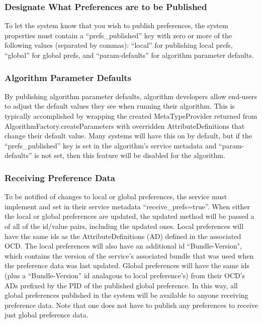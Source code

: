 \subsubsection*{Designate What Preferences are to be Published} To let the system
know that you wish to publish preferences, the system properties must contain a
``prefs\_published'' key with zero or more of the following values (separated by
commas): ``local'' for publishing local prefs, ``global'' for global prefs, and
``param-defaults'' for algorithm parameter defaults.

\subsubsection*{Algorithm Parameter Defaults} 
By publishing algorithm parameter defaults, algorithm developers allow
end-users to adjust the default values they see when running their algorithm.
This is typically accomplished by wrapping the created MetaTypeProvider
returned from AlgorithmFactory.createParameters with overridden
AttributeDefinitions that change their default value. Many systems will have
this on by default, but if the ``prefs\_published'' key is set in the
algorithm's service metadata and ``param-defaults'' is not set, then this
feature will be disabled for the algorithm.

\subsubsection*{Receiving Preference Data} To be notified of changes to local or
global preferences, the service must implement
 and set in their service
metadata ``receive\_prefs=true''. When either the local or global preferences are updated,
the updated method will be passed a  of all of the id/value
pairs, including the updated ones. Local preferences will have the same ids as
the AttributeDefinitions (AD) defined in the associated OCD. The local
preferences will also have an additional id ``Bundle-Version", which contains the
version of the service's associated bundle that was used when the preference data
was last updated. Global preferences will have the same ids (plus a
``Bundle-Version'' id analagous to local preference's) from their OCD's ADs
prefixed by the PID of the published global preference. In this way, all global
preferences published in the system will be available to anyone receiving
preference data. Note that one does not have to publish any preferences to
receive just global preference data.

